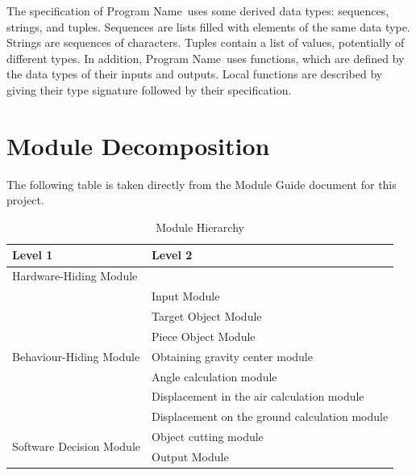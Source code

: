\documentclass[12pt, titlepage]{article}
\newcommand{\progname}{Program Name}
\begin{document}
\noindent
The specification of \progname \ uses some derived data types: sequences, strings, and
tuples. Sequences are lists filled with elements of the same data type. Strings
are sequences of characters. Tuples contain a list of values, potentially of
different types. In addition, \progname \ uses functions, which
are defined by the data types of their inputs and outputs. Local functions are
described by giving their type signature followed by their specification.

\section{Module Decomposition}

The following table is taken directly from the Module Guide document for this project.

\begin{table}[h!]
	\centering
	\begin{tabular}{p{} p{}}
		\toprule
		\textbf{Level 1} & \textbf{Level 2}\\
		\midrule
		
		{Hardware-Hiding Module} & ~ \\
		\midrule
		
		\multirow{7}{0.3\textwidth}{Behaviour-Hiding Module} & Input Module\\
		& Target Object Module\\
		& Piece Object Module\\
		& Obtaining gravity center module\\
		& Angle calculation module\\
		& Displacement in the air calculation module\\
		& Displacement on the ground calculation module\\
		\midrule
		
		\multirow{3}{0.3\textwidth}{Software Decision Module} & Object cutting module\\
		& Output Module\\
		\bottomrule
		
	\end{tabular}
	\caption{Module Hierarchy}
	\label{TblMH}
\end{table}
\end{document}
